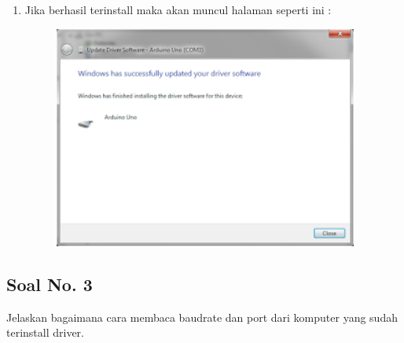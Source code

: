 \begin{enumerate}
\begin{figure}[H]
		\centering
	\end{figure}
	\item Jika berhasil terinstall maka akan muncul halaman seperti ini :
	\begin{figure}[H]
		\includegraphics[width=10cm]{figures/5/1174021/Teori/10.png}
		\centering
	\end{figure}
\end{enumerate}

\subsection{Soal No. 3}
Jelaskan bagaimana cara membaca baudrate dan port dari komputer yang sudah terinstall driver.

